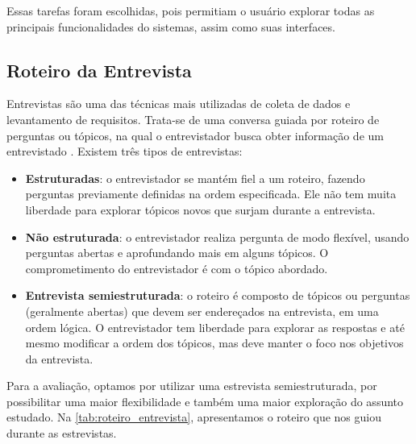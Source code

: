 Essas tarefas foram escolhidas, pois permitiam o usuário explorar todas as principais funcionalidades do sistemas, assim como suas interfaces. 

\subsection{Roteiro da Entrevista}
Entrevistas são uma das técnicas mais utilizadas de coleta de dados e levantamento de requisitos. Trata-se de uma conversa guiada por roteiro de perguntas ou tópicos, na qual o entrevistador busca obter informação de um entrevistado \cite{seidman1998interview}. Existem três tipos de entrevistas:
\begin{itemize}
	\item \textbf{Estruturadas}: o entrevistador se mantém fiel a um roteiro, fazendo perguntas previamente definidas na ordem especificada. Ele não tem muita liberdade para explorar tópicos novos que surjam durante a entrevista.
	\item \textbf{Não estruturada}:  o entrevistador realiza pergunta de modo flexível, usando perguntas abertas e aprofundando mais em alguns tópicos. O comprometimento do entrevistador é com o tópico abordado.
	\item \textbf{Entrevista semiestruturada}: o roteiro é composto de tópicos ou perguntas (geralmente abertas) que devem ser endereçados na entrevista, em uma ordem lógica. O entrevistador tem liberdade para explorar as respostas e até mesmo modificar a ordem dos tópicos, mas deve manter o foco nos objetivos da entrevista. 
\end{itemize}

Para a avaliação, optamos por utilizar uma estrevista semiestruturada,  por possibilitar uma maior flexibilidade e também uma maior exploração do assunto estudado. Na \autoref{tab:roteiro_entrevista}, apresentamos o roteiro que nos guiou durante as estrevistas.


